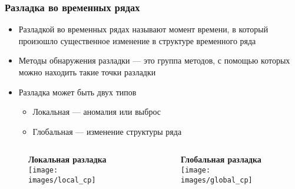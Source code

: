\documentclass[intlimits, 9pt, unicode]{beamer}
\begin{document}
\begin{frame}
    \frametitle{Разладка во временных рядах}

    \begin{itemize}
    	\item Разладкой во временных рядах называют момент времени, в который произошло существенное изменение в структуре временного ряда
	\item Методы обнаружения разладки --- это группа методов, с помощью которых можно находить такие точки разладки
	\item Разладка может быть двух типов
		\begin{itemize}
			\item Локальная --- аномалия или выброс
			\item Глобальная --- изменение структуры ряда
		\end{itemize}
    \end{itemize}

    {\begin{columns}
        \begin{column}{5cm}
        \begin{figure}
        \centering
	\textbf{Локальная разладка}
        \texttt{[image: images/local\_cp]}
	\end{figure}
        \end{column}

        \begin{column}{5cm}
	\begin{figure}
    	\centering
	\textbf{Глобальная разладка}
        \texttt{[image: images/global\_cp]}
	\end{figure}
        \end{column}
    \end{columns}}

\end{frame}
\end{document}
